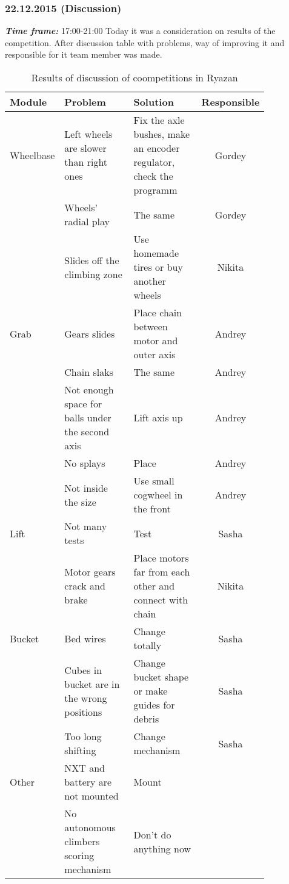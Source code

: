 \subsubsection{22.12.2015 (Discussion)}
\textit{\textbf{Time frame:}} 17:00-21:00 \newline
Today it was a consideration on results of the competition. After discussion table with problems, way of improving it and responsible for it team member was made.
\begin{table}[H]
	\caption{Results of discussion of coompetitions in Ryazan}
	\label{tabular:meetingRZN22.12}
	\begin{center}
		\begin{tabular}{|p{0.12\linewidth}|p{0.35\linewidth}|p{0.38\linewidth}|c|}
		  \hline
		  Module & Problem	& Solution	& Responsible \\
		  \hline
		  Wheelbase	& Left wheels are slower than right ones & Fix the axle bushes, make an encoder regulator, check the programm & Gordey \\
		  & Wheels' radial play & The same & Gordey \\
		  & Slides off the climbing zone	& Use homemade tires or buy another wheels & Nikita \\
		  \hline
		  Grab	& Gears slides	& Place chain between motor and outer axis & 	Andrey \\
		  & Chain slaks	& The same & Andrey \\	
		  & Not enough space for balls under the second axis	& Lift axis up	& Andrey \\
		  & No splays & Place & Andrey \\
		  & Not inside the size	& Use small cogwheel in the front & Andrey \\
		  \hline
		  Lift & Not many tests & Test & Sasha \\
		  & Motor gears crack and brake	& Place motors far from each other and connect with chain & Nikita \\
		  \hline
		  Bucket & Bed wires & Change totally	& Sasha \\
		  & Cubes in bucket are in the wrong positions	& Change bucket shape or make guides for debris	& Sasha \\
		  & Too long shifting	& Change mechanism & Sasha \\
		  \hline
		  Other	& NXT and battery are not mounted & Mount \\	
		  & No autonomous climbers scoring mechanism	& Don't do anything now & \\	
		  \hline
		  	
		\end{tabular}
	\end{center}
\end{table}

